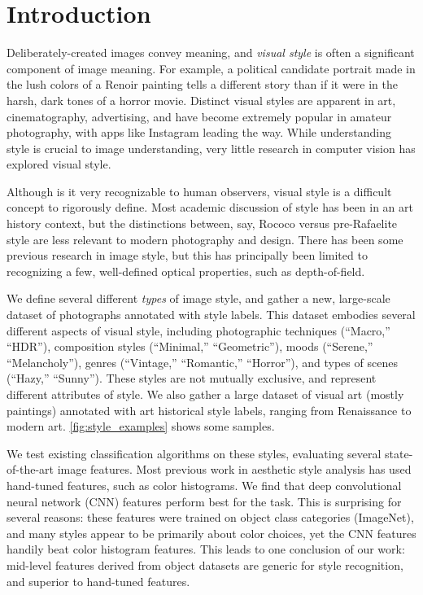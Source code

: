 \section{Introduction}


Deliberately-created images convey meaning, and \textit{visual style} is often a significant component of image meaning.
For example, a political candidate portrait made in the lush colors of a Renoir painting tells a different story than if it were in the harsh, dark tones of a horror movie.
Distinct visual styles are apparent in art, cinematography, advertising, and have become extremely popular in amateur photography, with apps like Instagram leading the way.
While understanding style is crucial to image understanding, very little research in computer vision has explored visual style.

Although is it very recognizable to human observers, visual style is a difficult concept to rigorously define.
Most academic discussion of style has been in an art history context, but the distinctions between, say, Rococo versus pre-Rafaelite style are less relevant to modern photography and design.
There has been some previous research in image style, but this has principally been limited to recognizing a few, well-defined optical properties, such as depth-of-field.

We define several different \textit{types} of image style, and gather a new, large-scale dataset of photographs annotated with style labels.
This dataset embodies several different aspects of visual style, including photographic techniques  (``Macro,'' ``HDR''), composition styles (``Minimal,'' ``Geometric''), moods (``Serene,'' ``Melancholy''), genres (``Vintage,'' ``Romantic,'' ``Horror''), and types of scenes (``Hazy,'' ``Sunny'').
These styles are not mutually exclusive, and represent different attributes of style.
We  also gather a large dataset of visual art (mostly paintings) annotated with art historical style labels, ranging from Renaissance to modern art.
\autoref{fig:style_examples} shows some samples.

We test existing classification algorithms on these styles, evaluating several state-of-the-art image features.
Most previous work in aesthetic style analysis has  used hand-tuned features, such as color histograms.
We find that deep convolutional neural network (CNN) features perform best for the task.
This is surprising for several reasons: these features were trained on object class categories (ImageNet), and many styles appear to be primarily about color choices, yet the CNN features handily beat color histogram features.
This leads to one conclusion of our work: mid-level features derived from object datasets are generic for style recognition, and superior to hand-tuned features.

